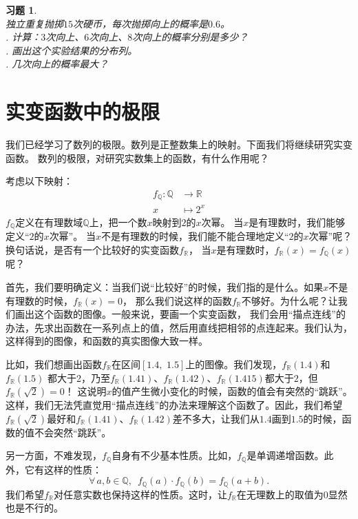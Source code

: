 \documentclass[12pt,UTF8]{ctexbook}
\newtheorem{xt}{习题}[section]
\begin{document}
\begin{xt}
    \mbox{} \\
    独立重复抛掷$15$次硬币，每次抛掷向上的概率是$0.6$。\\
    . 计算：$3$次向上、$6$次向上、$8$次向上的概率分别是多少？\\
    . 画出这个实验结果的分布列。\\
    . 几次向上的概率最大？
\end{xt}

\chapter{实变函数中的极限}
我们已经学习了数列的极限。数列是正整数集上的映射。下面我们将继续研究实变函数。
数列的极限，对研究实数集上的函数，有什么作用呢？

考虑以下映射：
\begin{align*}
    f_{\mathbb{Q}}: \mathbb{Q} &\rightarrow \mathbb{R} \\
    x &\mapsto 2^x 
\end{align*}
$f_{\mathbb{Q}}$定义在有理数域$\mathbb{Q}$上，把一个数$x$映射到$2$的$x$次幂。
当$x$是有理数时，我们能够定义“$2$的$x$次幂”。
当$x$不是有理数的时候，我们能不能合理地定义“$2$的$x$次幂”呢？换句话说，是否有一个比较好的实变函数$f_{\mathbb{R}}$，
当$x$是有理数时，$f_{\mathbb{R}}(x) = f_{\mathbb{Q}}(x)$呢？

首先，我们要明确定义：当我们说“比较好”的时候，我们指的是什么。如果$x$不是有理数的时候，$f_{\mathbb{R}}(x) = 0$，
那么我们说这样的函数$f_{\mathbb{R}}$不够好。为什么呢？让我们画出这个函数的图像。一般来说，要画一个实变函数，
我们会用“描点连线”的办法，先求出函数在一系列点上的值，然后用直线把相邻的点连起来。我们认为，这样得到的图像，和函数的真实图像大致一样。

比如，我们想画出函数$f_{\mathbb{R}}$在区间$[1.4,\,\,1.5]$上的图像。我们发现，$f_{\mathbb{R}}(1.4)$和$f_{\mathbb{R}}(1.5)$
都大于2，乃至$f_{\mathbb{R}}(1.41)$、$f_{\mathbb{R}}(1.42)$、$f_{\mathbb{R}}(1.415)$都大于$2$，但$f_{\mathbb{R}}(\sqrt{2}) = 0$！
这说明$x$的值产生微小变化的时候，函数的值会有突然的“跳跃”。这样，我们无法凭直觉用“描点连线”的办法来理解这个函数了。因此，我们希望
$f_{\mathbb{R}}(\sqrt{2})$最好和$f_{\mathbb{R}}(1.41)$、$f_{\mathbb{R}}(1.42)$差不多大，让我们从$1.4$画到$1.5$的时候，函数的值不会突然“跳跃”。

另一方面，不难发现，$f_{\mathbb{Q}}$自身有不少基本性质。比如，$f_{\mathbb{Q}}$是单调递增函数。此外，它有这样的性质：
$$\forall \, a, b\in \mathbb{Q}, \,\,\, f_{\mathbb{Q}}(a) \cdot f_{\mathbb{Q}}(b) = f_{\mathbb{Q}}(a + b).$$
我们希望$f_{\mathbb{R}}$对任意实数也保持这样的性质。这时，让$f_{\mathbb{R}}$在无理数上的取值为$0$显然也是不行的。
\end{document}
